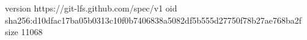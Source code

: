 version https://git-lfs.github.com/spec/v1
oid sha256:d10dfac17ba05b0313c10f0b7406838a5082df5b555d27750f78b27ae768ba2f
size 11068
